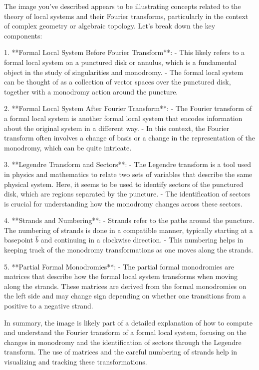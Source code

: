 The image you've described appears to be illustrating concepts related to the theory of local systems and their Fourier transforms, particularly in the context of complex geometry or algebraic topology. Let's break down the key components:

1. **Formal Local System Before Fourier Transform**:
   - This likely refers to a formal local system on a punctured disk or annulus, which is a fundamental object in the study of singularities and monodromy.
   - The formal local system can be thought of as a collection of vector spaces over the punctured disk, together with a monodromy action around the puncture.

2. **Formal Local System After Fourier Transform**:
   - The Fourier transform of a formal local system is another formal local system that encodes information about the original system in a different way.
   - In this context, the Fourier transform often involves a change of basis or a change in the representation of the monodromy, which can be quite intricate.

3. **Legendre Transform and Sectors**:
   - The Legendre transform is a tool used in physics and mathematics to relate two sets of variables that describe the same physical system. Here, it seems to be used to identify sectors of the punctured disk, which are regions separated by the puncture.
   - The identification of sectors is crucial for understanding how the monodromy changes across these sectors.

4. **Strands and Numbering**:
   - Strands refer to the paths around the puncture. The numbering of strands is done in a compatible manner, typically starting at a basepoint \(\widehat{b}\) and continuing in a clockwise direction.
   - This numbering helps in keeping track of the monodromy transformations as one moves along the strands.

5. **Partial Formal Monodromies**:
   - The partial formal monodromies are matrices that describe how the formal local system transforms when moving along the strands. These matrices are derived from the formal monodromies on the left side and may change sign depending on whether one transitions from a positive to a negative strand.

In summary, the image is likely part of a detailed explanation of how to compute and understand the Fourier transform of a formal local system, focusing on the changes in monodromy and the identification of sectors through the Legendre transform. The use of matrices and the careful numbering of strands help in visualizing and tracking these transformations.